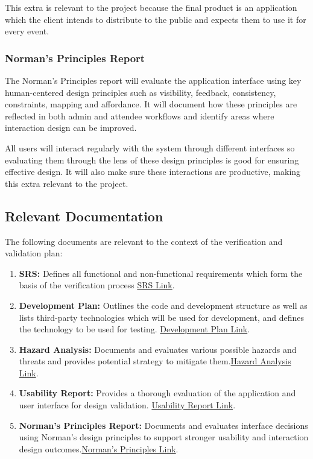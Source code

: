 \documentclass[12pt, titlepage]{article}
\begin{document}
This extra is relevant to the project because the final product is an application which the client
intends to distribute to the public and expects them to use it for every event.

\subsubsection{Norman's Principles Report}
The Norman's Principles report will evaluate the application interface using key human-centered design principles such as
visibility, feedback, consistency, constraints, mapping and affordance. It will document how these principles are reflected in both
admin and attendee workflows and identify areas where interaction design can be improved.

All users will interact regularly with the system through different interfaces so evaluating them through the lens of these design principles is good for ensuring effective design. It will also make sure these interactions are productive, making this extra relevant to the project.

\subsection{Relevant Documentation}
The following documents are relevant to the context of the verification and validation plan:
\begin{enumerate}[align=left,
  leftmargin=*,
  labelsep=1em,
  itemindent=0em, font=\bfseries]
  \item {\bfseries SRS:} Defines all functional and non-functional requirements which form the basis of the verification
    process \href{https://github.com/VirochaanRG/MES-Event-Management-System/blob/main/docs/SRS/SRS.pdf}{SRS Link}.
  \item {\bfseries Development Plan:} Outlines the code and development structure as well as lists third-party
    technologies which will be used for development, and defines the technology to be used for testing. \href{https://github.com/VirochaanRG/MES-Event-Management-System/blob/main/docs/DevelopmentPlan/DevelopmentPlan.pdf}{Development Plan Link}.
    \item {\bfseries Hazard Analysis:} Documents and evaluates various possible hazards and threats and provides potential strategy to mitigate them.\href{https://github.com/VirochaanRG/MES-Event-Management-System/blob/main/docs/HazardAnalysis/HazardAnalysis.pdf}{Hazard Analysis Link}.
  \item {\bfseries Usability Report:} Provides a thorough evaluation of the application and user interface for design
    validation. \href{https://github.com/VirochaanRG/MES-Event-Management-System/blob/main/docs/Extras/UsabilityTesting/UsabilityReport.pdf}{Usability Report Link}.
  \item {\bfseries Norman's Principles Report:} Documents and evaluates interface decisions using Norman's design
    principles to support stronger usability and interaction design outcomes.\href{https://github.com/VirochaanRG/MES-Event-Management-System/blob/main/docs/Extras/NormansPrinciples/NormansPrinciples.pdf}{Norman's Principles Link}.
\end{enumerate}
\end{document}
